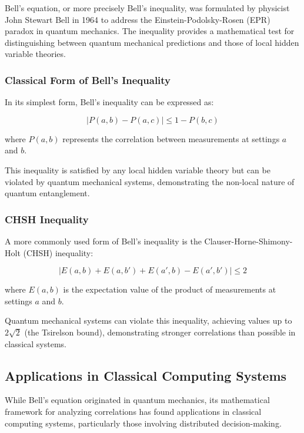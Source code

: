 \documentclass{article}
\begin{document}
Bell's equation, or more precisely Bell's inequality, was formulated by physicist John Stewart Bell in 1964 to address the Einstein-Podolsky-Rosen (EPR) paradox in quantum mechanics. The inequality provides a mathematical test for distinguishing between quantum mechanical predictions and those of local hidden variable theories.

\subsubsection{Classical Form of Bell's Inequality}

In its simplest form, Bell's inequality can be expressed as:

\begin{equation}
|P(a,b) - P(a,c)| \leq 1 - P(b,c)
\end{equation}

where $P(a,b)$ represents the correlation between measurements at settings $a$ and $b$.

This inequality is satisfied by any local hidden variable theory but can be violated by quantum mechanical systems, demonstrating the non-local nature of quantum entanglement.

\subsubsection{CHSH Inequality}

A more commonly used form of Bell's inequality is the Clauser-Horne-Shimony-Holt (CHSH) inequality:

\begin{equation}
|E(a,b) + E(a,b') + E(a',b) - E(a',b')| \leq 2
\end{equation}

where $E(a,b)$ is the expectation value of the product of measurements at settings $a$ and $b$.

Quantum mechanical systems can violate this inequality, achieving values up to $2\sqrt{2}$ (the Tsirelson bound), demonstrating stronger correlations than possible in classical systems.

\subsection{Applications in Classical Computing Systems}

While Bell's equation originated in quantum mechanics, its mathematical framework for analyzing correlations has found applications in classical computing systems, particularly those involving distributed decision-making.
\end{document}
